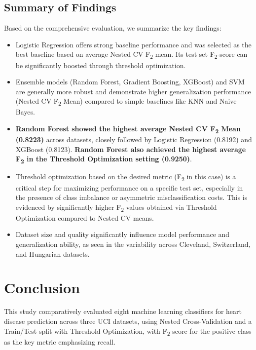 \documentclass{article}
\begin{document}
\clearpage

\subsection{Summary of Findings}
\label{sec:summary_of_findings}
Based on the comprehensive evaluation, we summarize the key findings:

\begin{itemize}
    \item Logistic Regression offers strong baseline performance and was selected as the best baseline based on average Nested CV F\textsubscript{2} mean. Its test set F\textsubscript{2}-score can be significantly boosted through threshold optimization.
    \item Ensemble models (Random Forest, Gradient Boosting, XGBoost) and SVM are generally more robust and demonstrate higher generalization performance (Nested CV F\textsubscript{2} Mean) compared to simple baselines like KNN and Naive Bayes.
    \item \textbf{Random Forest showed the highest average Nested CV F\textsubscript{2} Mean (0.8223)} across datasets, closely followed by Logistic Regression (0.8192) and XGBoost (0.8123). \textbf{Random Forest also achieved the highest average F\textsubscript{2} in the Threshold Optimization setting (0.9250)}.
    \item Threshold optimization based on the desired metric (F\textsubscript{2} in this case) is a critical step for maximizing performance on a specific test set, especially in the presence of class imbalance or asymmetric misclassification costs. This is evidenced by significantly higher F\textsubscript{2} values obtained via Threshold Optimization compared to Nested CV means.
    \item Dataset size and quality significantly influence model performance and generalization ability, as seen in the variability across Cleveland, Switzerland, and Hungarian datasets.
\end{itemize}

\section{Conclusion} %
\label{sec:conclusion}

This study comparatively evaluated eight machine learning classifiers for heart disease prediction across three UCI datasets, using Nested Cross-Validation and a Train/Test split with Threshold Optimization, with F\textsubscript{2}-score for the positive class as the key metric emphasizing recall.
\end{document}

